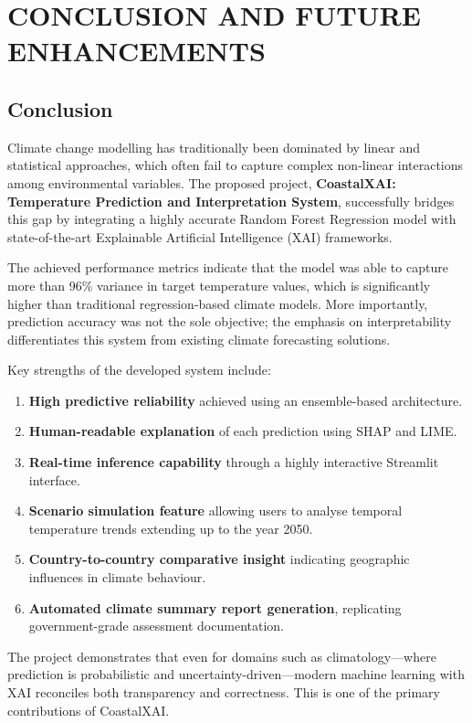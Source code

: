 \documentclass[12pt, a4paper]{article}
\begin{document}
\section{\textbf{CONCLUSION AND FUTURE ENHANCEMENTS}}

\subsection{\textbf{Conclusion}}

Climate change modelling has traditionally been dominated by linear and statistical approaches, which often fail to capture complex non-linear interactions among environmental variables. The proposed project, \textbf{CoastalXAI: Temperature Prediction and Interpretation System}, successfully bridges this gap by integrating a highly accurate Random Forest Regression model with state-of-the-art Explainable Artificial Intelligence (XAI) frameworks.

The achieved performance metrics indicate that the model was able to capture more than 96\% variance in target temperature values, which is significantly higher than traditional regression-based climate models. More importantly, prediction accuracy was not the sole objective; the emphasis on interpretability differentiates this system from existing climate forecasting solutions.

Key strengths of the developed system include:

\begin{enumerate}
    \item \textbf{High predictive reliability} achieved using an ensemble-based architecture.
    \item \textbf{Human-readable explanation} of each prediction using SHAP and LIME.
    \item \textbf{Real-time inference capability} through a highly interactive Streamlit interface.
    \item \textbf{Scenario simulation feature} allowing users to analyse temporal temperature trends extending up to the year 2050.
    \item \textbf{Country-to-country comparative insight} indicating geographic influences in climate behaviour.
    \item \textbf{Automated climate summary report generation}, replicating government-grade assessment documentation.
\end{enumerate}

The project demonstrates that even for domains such as climatology—where prediction is probabilistic and uncertainty-driven—modern machine learning with XAI reconciles both transparency and correctness. This is one of the primary contributions of CoastalXAI.
\end{document}
